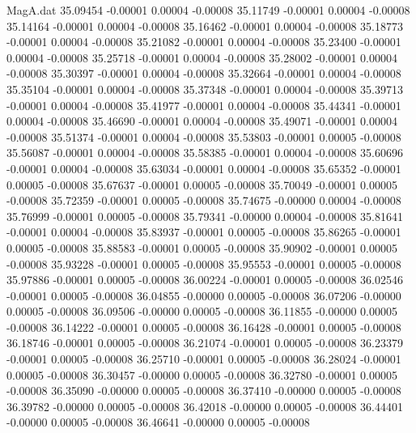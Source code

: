 \begin{filecontents}{MagA.dat}
  35.09454   -0.00001    0.00004   -0.00008
  35.11749   -0.00001    0.00004   -0.00008
  35.14164   -0.00001    0.00004   -0.00008
  35.16462   -0.00001    0.00004   -0.00008
  35.18773   -0.00001    0.00004   -0.00008
  35.21082   -0.00001    0.00004   -0.00008
  35.23400   -0.00001    0.00004   -0.00008
  35.25718   -0.00001    0.00004   -0.00008
  35.28002   -0.00001    0.00004   -0.00008
  35.30397   -0.00001    0.00004   -0.00008
  35.32664   -0.00001    0.00004   -0.00008
  35.35104   -0.00001    0.00004   -0.00008
  35.37348   -0.00001    0.00004   -0.00008
  35.39713   -0.00001    0.00004   -0.00008
  35.41977   -0.00001    0.00004   -0.00008
  35.44341   -0.00001    0.00004   -0.00008
  35.46690   -0.00001    0.00004   -0.00008
  35.49071   -0.00001    0.00004   -0.00008
  35.51374   -0.00001    0.00004   -0.00008
  35.53803   -0.00001    0.00005   -0.00008
  35.56087   -0.00001    0.00004   -0.00008
  35.58385   -0.00001    0.00004   -0.00008
  35.60696   -0.00001    0.00004   -0.00008
  35.63034   -0.00001    0.00004   -0.00008
  35.65352   -0.00001    0.00005   -0.00008
  35.67637   -0.00001    0.00005   -0.00008
  35.70049   -0.00001    0.00005   -0.00008
  35.72359   -0.00001    0.00005   -0.00008
  35.74675   -0.00000    0.00004   -0.00008
  35.76999   -0.00001    0.00005   -0.00008
  35.79341   -0.00000    0.00004   -0.00008
  35.81641   -0.00001    0.00004   -0.00008
  35.83937   -0.00001    0.00005   -0.00008
  35.86265   -0.00001    0.00005   -0.00008
  35.88583   -0.00001    0.00005   -0.00008
  35.90902   -0.00001    0.00005   -0.00008
  35.93228   -0.00001    0.00005   -0.00008
  35.95553   -0.00001    0.00005   -0.00008
  35.97886   -0.00001    0.00005   -0.00008
  36.00224   -0.00001    0.00005   -0.00008
  36.02546   -0.00001    0.00005   -0.00008
  36.04855   -0.00000    0.00005   -0.00008
  36.07206   -0.00000    0.00005   -0.00008
  36.09506   -0.00000    0.00005   -0.00008
  36.11855   -0.00000    0.00005   -0.00008
  36.14222   -0.00001    0.00005   -0.00008
  36.16428   -0.00001    0.00005   -0.00008
  36.18746   -0.00001    0.00005   -0.00008
  36.21074   -0.00001    0.00005   -0.00008
  36.23379   -0.00001    0.00005   -0.00008
  36.25710   -0.00001    0.00005   -0.00008
  36.28024   -0.00001    0.00005   -0.00008
  36.30457   -0.00000    0.00005   -0.00008
  36.32780   -0.00001    0.00005   -0.00008
  36.35090   -0.00000    0.00005   -0.00008
  36.37410   -0.00000    0.00005   -0.00008
  36.39782   -0.00000    0.00005   -0.00008
  36.42018   -0.00000    0.00005   -0.00008
  36.44401   -0.00000    0.00005   -0.00008
  36.46641   -0.00000    0.00005   -0.00008

\end{filecontents}
